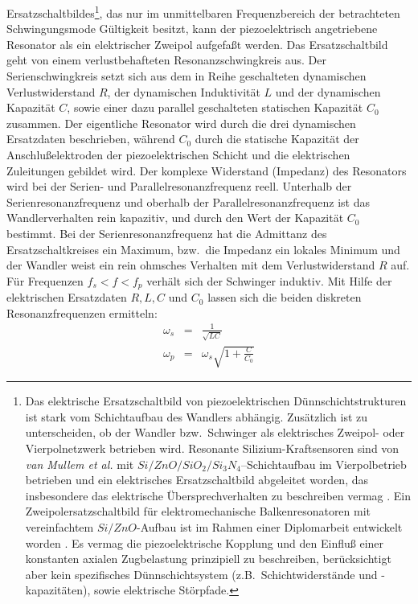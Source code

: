 Ersatzschaltbildes\footnote{Das elektrische Ersatzschaltbild von
piezoelektrischen Dünnschichtstrukturen ist stark vom Schichtaufbau des
Wandlers abhängig. Zusätzlich ist zu unterscheiden, ob der Wandler bzw.\
Schwinger als elektrisches Zweipol- oder Vierpolnetzwerk betrieben wird.
Resonante Silizium-Kraftsensoren sind von {\sl van Mullem et al.} mit
$Si/ZnO/SiO_{2}/Si_{3}N_{4}$--Schichtaufbau im Vierpolbetrieb betrieben
und ein elektrisches Ersatzschaltbild abgeleitet worden, das insbesondere
das elektrische Übersprechverhalten zu beschreiben vermag \cite{Mul92}.
Ein Zweipolersatzschaltbild für elektromechanische Balkenresonatoren mit
vereinfachtem $Si/ZnO$-Aufbau ist im Rahmen einer Diplomarbeit entwickelt
worden \cite{Qui93}. Es vermag die piezoelektrische Kopplung und den Einfluß
einer konstanten axialen Zugbelastung prinzipiell zu beschreiben,
berücksichtigt aber kein spezifisches Dünnschichtsystem (z.B.\
Schichtwiderstände und -kapazitäten), sowie elektrische Störpfade.},
das nur im unmittelbaren Frequenzbereich der
betrachteten Schwingungsmode Gültigkeit besitzt, kann der piezoelektrisch
angetriebene Resonator als ein elektrischer Zweipol aufgefaßt werden.
Das Ersatzschaltbild geht von einem verlustbehafteten Resonanzschwingkreis
aus. Der Serienschwingkreis setzt sich aus dem in Reihe geschalteten
dynamischen Verlustwiderstand $R$, der dynamischen Induktivität $L$ und der
dynamischen Kapazität $C$, sowie einer dazu parallel geschalteten statischen
Kapazität $C_{0}$ zusammen. Der eigentliche Resonator wird durch die drei
dynamischen Ersatzdaten beschrieben, während $C_{0}$ durch die statische
Kapazität der Anschlußelektroden der piezoelektrischen Schicht und die
elektrischen Zuleitungen gebildet wird. Der komplexe Widerstand (Impedanz)
des Resonators wird bei der Serien- und Parallelresonanzfrequenz reell.
Unterhalb der Serienresonanzfrequenz und oberhalb der
Parallelresonanzfrequenz ist das Wandlerverhalten rein kapazitiv, und durch
den Wert der Kapazität $C_{0}$ bestimmt. Bei der
Serienresonanzfrequenz hat die Admittanz des Ersatzschaltkreises ein
Maximum, bzw.\ die Impedanz ein lokales Minimum und der Wandler weist ein
rein ohmsches Verhalten mit dem Verlustwiderstand $R$ auf. Für Frequenzen
$f_{s} < f < f_{p}$ verhält sich der Schwinger induktiv. Mit Hilfe der
elektrischen Ersatzdaten $R, L, C$ und $C_{0}$ lassen sich die
beiden diskreten Resonanzfrequenzen ermitteln:
\begin{eqnarray}
\label{fserfpar}
 \omega_{s}   & = & \frac{1}{\sqrt{LC}} \nonumber \\
 \omega_{p}   & = & \omega_{s} \sqrt{1+\frac{C}{C_{0}}}
\end{eqnarray}

